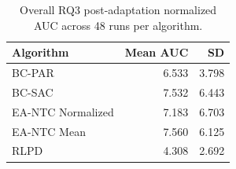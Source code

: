 \begin{table}[t]
\centering
\caption{Overall RQ3 post-adaptation normalized AUC across 48 runs per algorithm.}
\label{tab:rq3_overall_auc}
\begin{tabular}{lrr}
\toprule
Algorithm & Mean AUC & SD \\
\midrule
BC-PAR & 6.533 & 3.798 \\
BC-SAC & 7.532 & 6.443 \\
EA-NTC Normalized & 7.183 & 6.703 \\
EA-NTC Mean & 7.560 & 6.125 \\
RLPD & 4.308 & 2.692 \\
\bottomrule
\end{tabular}
\end{table}
